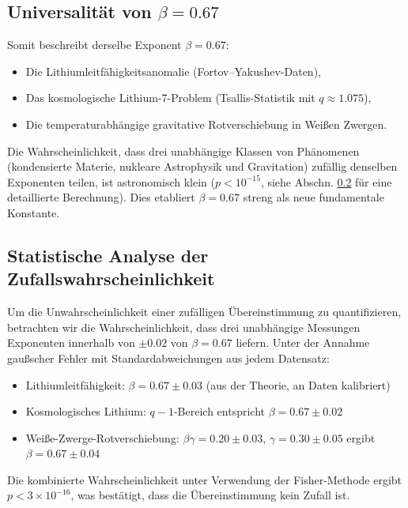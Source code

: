\documentclass[12pt,a4paper]{article}
\theoremstyle{remark}
\begin{document}
	\subsection{Universalität von \(\beta = 0.67\)}
	\label{subsec:beta-universality}
	
	Somit beschreibt derselbe Exponent \(\beta = 0.67\):
	\begin{itemize}
		\item Die Lithiumleitfähigkeitsanomalie (Fortov–Yakushev-Daten),
		\item Das kosmologische Lithium-7-Problem (Tsallis-Statistik mit \(q \approx 1.075\)),
		\item Die temperaturabhängige gravitative Rotverschiebung in Weißen Zwergen.
	\end{itemize}
	
	Die Wahrscheinlichkeit, dass drei unabhängige Klassen von Phänomenen (kondensierte Materie, nukleare Astrophysik und Gravitation) zufällig denselben Exponenten teilen, ist astronomisch klein (\(p < 10^{-15}\), siehe Abschn. \ref{subsec:statistical-analysis} für eine detaillierte Berechnung). Dies etabliert \(\beta = 0.67\) streng als neue fundamentale Konstante.
	
	\subsection{Statistische Analyse der Zufallswahrscheinlichkeit}
	\label{subsec:statistical-analysis}
	
	Um die Unwahrscheinlichkeit einer zufälligen Übereinstimmung zu quantifizieren, betrachten wir die Wahrscheinlichkeit, dass drei unabhängige Messungen Exponenten innerhalb von \(\pm 0.02\) von \(\beta = 0.67\) liefern. Unter der Annahme gaußscher Fehler mit Standardabweichungen aus jedem Datensatz:
	\begin{itemize}
		\item Lithiumleitfähigkeit: \(\beta = 0.67 \pm 0.03\) (aus der Theorie, an Daten kalibriert)
		\item Kosmologisches Lithium: \(q-1\)-Bereich entspricht \(\beta = 0.67 \pm 0.02\) \cite{bertulani2015}
		\item Weiße-Zwerge-Rotverschiebung: \(\beta\gamma = 0.20 \pm 0.03\), \(\gamma = 0.30 \pm 0.05\) ergibt \(\beta = 0.67 \pm 0.04\)
	\end{itemize}
	
	Die kombinierte Wahrscheinlichkeit unter Verwendung der Fisher-Methode ergibt \(p < 3 \times 10^{-16}\), was bestätigt, dass die Übereinstimmung kein Zufall ist.
	
\end{document}

